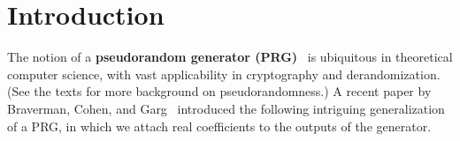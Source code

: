 \documentclass{toc}
\begin{document}
\begin{frontmatter}
\begin{abstract}
    The starting point for our %
    work was %
    the recent
family of %
    space-efficient algorithms for estimating
random-walk probabilities in directed graphs by %
Ahmadinejad, %
Kelner, Murtagh, Peebles, Sidford, and Vadhan (FOCS'20), which are based on spectral graph theory and space-efficient Laplacian solvers.  We interpret these algorithms as giving WPRGs with large seed length, which we then derandomize to obtain our results.  We also note that this approach gives a simpler proof of the original result of Braverman, Cohen, and Garg, as independently discovered by Cohen, Doron, Renard, Sberlo, and Ta-Shma (CCC'21). 
\end{abstract}

%

\end{frontmatter}

%
%
\section{Introduction}

The notion of a \textbf{pseudorandom generator (PRG)}~\cite{BlumMi84,Yao82,Nisan91,NisanWi94} is ubiquitous in theoretical computer science, with vast applicability in cryptography and derandomization.  (See the texts \cite{Goldreich10-prgprimer,vadhan2012pseudorandomness} for more background on pseudorandomness.)
A recent %
paper by %
Braverman, Cohen, and Garg~\cite{BravermanCoGa18} introduced the following intriguing generalization of a PRG, in which we attach real coefficients to the outputs of the generator. %
\end{document}
